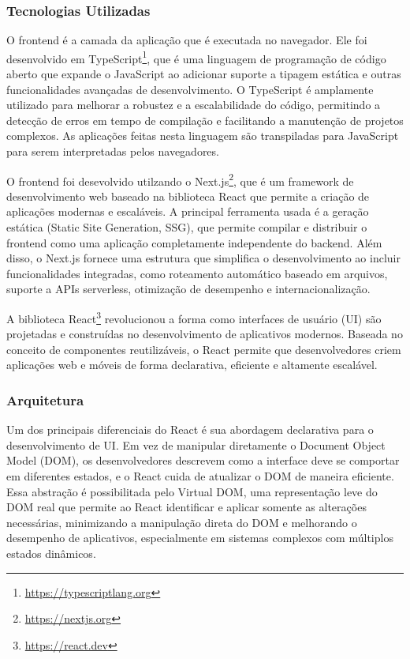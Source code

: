 \subsubsection{Tecnologias Utilizadas}
\label{sec:si-front-tech}

O frontend é a camada da aplicação que é executada no navegador. Ele foi desenvolvido em TypeScript\footnote{\url{https://typescriptlang.org}}, que é uma linguagem de programação de código aberto que expande o JavaScript ao adicionar suporte a tipagem estática e outras funcionalidades avançadas de desenvolvimento. O TypeScript é amplamente utilizado para melhorar a robustez e a escalabilidade do código, permitindo a detecção de erros em tempo de compilação e facilitando a manutenção de projetos complexos. As aplicações feitas nesta linguagem são transpiladas para JavaScript para serem interpretadas pelos navegadores.

O frontend foi desevolvido utilzando o Next.js\footnote{\url{https://nextjs.org}}, que é um framework de desenvolvimento web baseado na biblioteca React que permite a criação de aplicações modernas e escaláveis. A principal ferramenta usada é a geração estática (Static Site Generation, SSG), que permite compilar e distribuir o frontend como uma aplicação completamente independente do backend. Além disso, o Next.js fornece uma estrutura que simplifica o desenvolvimento ao incluir funcionalidades integradas, como roteamento automático baseado em arquivos, suporte a APIs serverless, otimização de desempenho e internacionalização.

A biblioteca React\footnote{\url{https://react.dev}} revolucionou a forma como interfaces de usuário (UI) são projetadas e construídas no desenvolvimento de aplicativos modernos. Baseada no conceito de componentes reutilizáveis, o React permite que desenvolvedores criem aplicações web e móveis de forma declarativa, eficiente e altamente escalável.


\subsubsection{Arquitetura}
\label{sec:si-front-arch}

Um dos principais diferenciais do React é sua abordagem declarativa para o desenvolvimento de UI. Em vez de manipular diretamente o Document Object Model (DOM), os desenvolvedores descrevem como a interface deve se comportar em diferentes estados, e o React cuida de atualizar o DOM de maneira eficiente. Essa abstração é possibilitada pelo Virtual DOM, uma representação leve do DOM real que permite ao React identificar e aplicar somente as alterações necessárias, minimizando a manipulação direta do DOM e melhorando o desempenho de aplicativos, especialmente em sistemas complexos com múltiplos estados dinâmicos.


